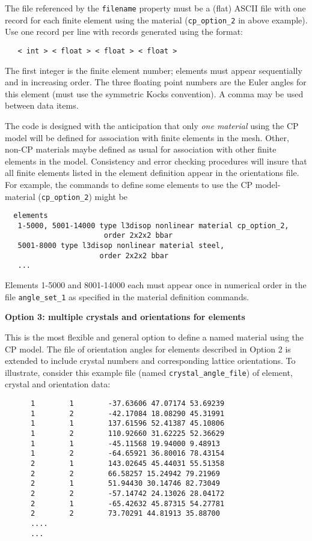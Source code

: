 \documentclass[11pt]{report}
\numberwithin{equation}{section}
\newcommand{\ttt} {\texttt}  %
\newcommand{\ti}{\emph}
\newcommand{\noi}{\noindent}
\begin{document}
The file referenced by the \ttt{filename} property must be a (flat) ASCII file with 
one record for each finite element using the material (\ttt{cp\_option\_2} in above example).
Use  one record per line 
with records generated using the format:

\small\begin{verbatim}
   < int > < float > < float > < float >      
\end{verbatim}\normalsize
\noindent The first integer is the finite element number; elements must appear
sequentially and in increasing order. The three floating
point numbers are the Euler angles for this element (must use the symmetric Kocks convention).
A comma may be used between data items.

The code is designed with the anticipation that only \ti{one material} using the CP model
will be defined for association with finite elements in the mesh. Other, non-CP
materials maybe defined as usual for association with other finite elements in the model.
Consistency and error checking procedures will insure that all finite elements listed in the
element definition appear in the orientations file. For example, the commands to define
some elements to use the CP model-material (\ttt{cp\_option\_2}) might be

\small
\begin{verbatim}
  elements 
   1-5000, 5001-14000 type l3disop nonlinear material cp_option_2,
                       order 2x2x2 bbar 
   5001-8000 type l3disop nonlinear material steel,
                      order 2x2x2 bbar
   ...
 \end{verbatim}
 \normalsize
\noi Elements 1-5000 and 8001-14000 each must appear once in numerical order in the file \ttt{angle\_set\_1} as
specified in the material definition commands.



\noi \textbf {Option 3: multiple crystals and orientations for elements} 

\noi This is the most flexible and general option to define a named material 
using the CP model.
The file of orientation angles for elements described in Option 2
is extended to include crystal
numbers and corresponding lattice orientations. To illustrate, consider this 
example file (named \ttt{crystal\_angle\_file}) of element, crystal and orientation data:


\small
\begin{verbatim}
      1        1        -37.63606 47.07174 53.69239
      1        2        -42.17084 18.08290 45.31991
      1        1        137.61596 52.41387 45.10806
      1        2        110.92660 31.62225 52.36629
      1        1        -45.11568 19.94000 9.48913 
      1        2        -64.65921 36.80016 78.43154
      2        1        143.02645 45.44031 55.51358
      2        2        66.58257 15.24942 79.21969
      2        1        51.94430 30.14746 82.73049
      2        2        -57.14742 24.13026 28.04172
      2        1        -65.42632 45.87315 54.27781
      2        2        73.70291 44.81913 35.88700
      ....
      ...
\end{verbatim}
\normalsize
\end{document}
